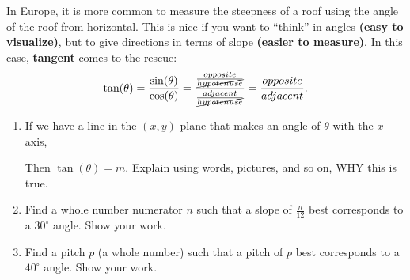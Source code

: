 \documentclass[noauthor,nooutcomes,hints,handout,12pt]{ximera}
\begin{document}
\begin{question}
In Europe, it is more common to measure the steepness of a roof using
the angle of the roof from horizontal. This is nice if you want to
``think'' in angles \textbf{(easy to visualize)}, but to give directions
in terms of slope \textbf{(easier to measure)}. In this case,
\textbf{tangent} comes to the rescue:
\[
\tan(\theta) = \frac{\sin(\theta)}{\cos(\theta)} = \frac{\frac{opposite}{\cancel{hypotenuse}}}{\frac{adjacent}{\cancel{hypotenuse}}}=\frac{opposite}{adjacent}.
\]



\begin{enumerate}
\item If we have a line in the $(x,y)$-plane that makes an angle of
  $\theta$ with the $x$-axis,
  \begin{center}
  \end{center}
  Then $\tan(\theta) = m$. Explain using words, pictures, and so on,
  WHY this is true.
\item Find a whole number numerator $n$ such that a slope of
  $\frac{n}{12}$ best corresponds to a $30^\circ$ angle. Show your
  work.
\item Find a pitch $p$ (a whole number) such that a pitch of $p$ best
  corresponds to a $40^\circ$ angle. Show your work.
\end{enumerate}
\end{question}
\mynewpage
\end{document}
